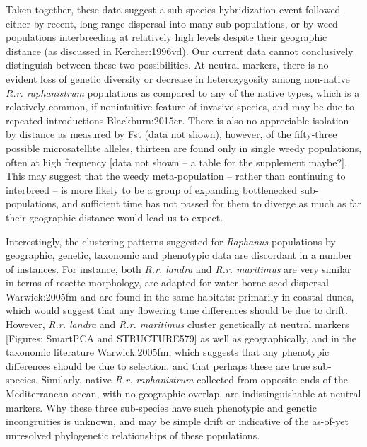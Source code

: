 \documentclass[twocolumn]{bmcart}%
\begin{document}
Taken together, these data suggest a sub-species hybridization event followed either by recent, long-range dispersal into many sub-populations, or by weed populations interbreeding at relatively high levels despite their geographic distance (as discussed in {Kercher:1996vd}). Our current data cannot conclusively distinguish between these two possibilities. At neutral markers, there is no evident loss of genetic diversity or decrease in heterozygosity among non-native \textit{R.r. raphanistrum} populations as compared to any of the native types, which is a relatively common, if nonintuitive feature of invasive species, and may be due to repeated introductions {Blackburn:2015cr}. There is also no appreciable isolation by distance as measured by Fst (data not shown), however, of the fifty-three possible microsatellite alleles, thirteen are found only in single weedy populations, often at high frequency [data not shown – a table for the supplement maybe?]. This may suggest that the weedy meta-population – rather than continuing to interbreed – is more likely to be a group of expanding bottlenecked sub-populations, and sufficient time has not passed for them to diverge as much as far their geographic distance would lead us to expect. 

Interestingly, the clustering patterns suggested for \textit{Raphanus} populations by geographic, genetic, taxonomic and phenotypic data are discordant in a number of instances. For instance, both \textit{R.r. landra} and \textit{R.r. maritimus} are very similar in terms of rosette morphology, are adapted for water-borne seed dispersal {Warwick:2005fm} and are found in the same habitats: primarily in coastal dunes, which would suggest that any flowering time differences should be due to drift. However, \textit{R.r. landra} and \textit{R.r. maritimus} cluster genetically at neutral markers [Figures: SmartPCA and STRUCTURE579] as well as geographically, and in the taxonomic literature {Warwick:2005fm}, which suggests that any phenotypic differences should be due to selection, and that perhaps these are true sub-species. Similarly, native \textit{R.r. raphanistrum} collected from opposite ends of the Mediterranean ocean, with no geographic overlap, are indistinguishable at neutral markers. Why these three sub-species have such phenotypic and genetic incongruities is unknown, and may be simple drift or indicative of the as-of-yet unresolved phylogenetic relationships of these populations. 
\end{document}
